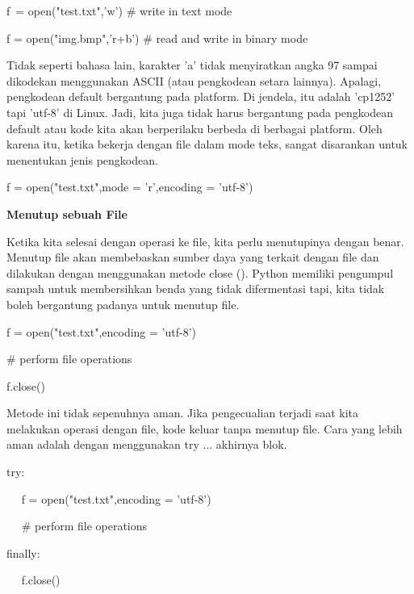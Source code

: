 \noindent 
f~= open("test.txt",'w')   $  \#  $ write in text mode \par
\noindent 
f = open("img.bmp",'r+b')  $  \#  $ read and write in binary mode \par
\vspace{12pt}
\noindent 
Tidak seperti bahasa lain, karakter 'a' tidak menyiratkan angka 97 sampai dikodekan menggunakan ASCII (atau pengkodean setara lainnya). Apalagi, pengkodean default bergantung pada platform. Di jendela, itu adalah 'cp1252' tapi 'utf-8' di Linux. Jadi, kita juga tidak harus bergantung pada pengkodean default atau kode kita akan berperilaku berbeda di berbagai platform. Oleh karena itu, ketika bekerja dengan file dalam mode teks, sangat disarankan untuk menentukan jenis pengkodean. \par
\vspace{12pt}
\noindent 
f = open("test.txt",mode = 'r',encoding = 'utf-8') \par
\vspace{12pt}
\noindent 
{\fontsize{14pt}{14pt}\selectfont \textbf{Menutup sebuah File} \\} \par
Ketika kita selesai dengan operasi ke file, kita perlu menutupinya dengan benar. Menutup file akan membebaskan sumber daya yang terkait dengan file dan dilakukan dengan menggunakan metode close (). Python memiliki pengumpul sampah untuk membersihkan benda yang tidak difermentasi tapi, kita tidak boleh bergantung padanya untuk menutup file. \par
\noindent 
f = open("test.txt",encoding = 'utf-8') \par
\noindent 
 $  \#  $ perform file operations \par
\noindent 
f.close() \par
\vspace{12pt}
\noindent 
Metode ini tidak sepenuhnya aman. Jika pengecualian terjadi saat kita melakukan operasi dengan file, kode keluar tanpa menutup file. Cara yang lebih aman adalah dengan menggunakan try ... akhirnya blok. \par
\vspace{12pt}
\noindent 
try: \par
\noindent 
~~ f = open("test.txt",encoding = 'utf-8') \par
\noindent 
~~  $  \#  $ perform file operations \par
\noindent 
finally: \par
\noindent 
~~ f.close() \par
\vspace{12pt}
